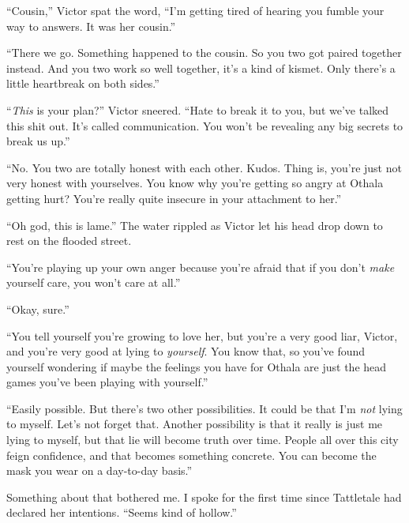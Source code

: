 ``Cousin,'' Victor spat the word, ``I'm getting tired of hearing you fumble your way to answers.  It was her cousin.''



``There we go.  Something happened to the cousin.  So you two got paired together instead.  And you two work so well together, it's a kind of kismet.  Only there's a little heartbreak on both sides.''



``\emph{This} is your plan?'' Victor sneered.  ``Hate to break it to you, but we've talked this shit out.  It's called communication.  You won't be revealing any big secrets to break us up.''



``No.  You two are totally honest with each other.  Kudos.  Thing is, you're just not very honest with yourselves.  You know why you're getting so angry at Othala getting hurt?  You're really quite insecure in your attachment to her.''



``Oh god, this is lame.''  The water rippled as Victor let his head drop down to rest on the flooded street.



``You're playing up your own anger because you're afraid that if you don't \emph{make} yourself care, you won't care at all.''



``Okay, sure.''



``You tell yourself you're growing to love her, but you're a very good liar, Victor, and you're very good at lying to \emph{yourself}.  You know that, so you've found yourself wondering if maybe the feelings you have for Othala are just the head games you've been playing with yourself.''



``Easily possible.  But there's two other possibilities.  It could be that I'm \emph{not} lying to myself.  Let's not forget that.  Another possibility is that it really is just me lying to myself, but that lie will become truth over time.  People all over this city feign confidence, and that becomes something concrete.  You can become the mask you wear on a day-to-day basis.''



Something about that bothered me.  I spoke for the first time since Tattletale had declared her intentions.  ``Seems kind of hollow.''



